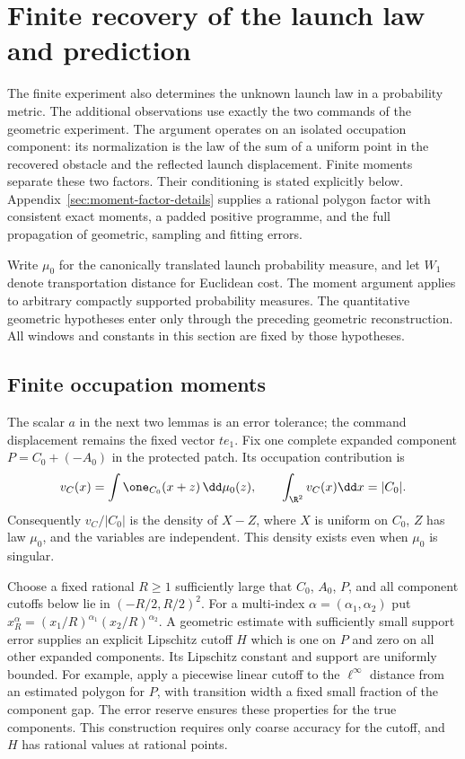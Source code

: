\section{Finite recovery of the launch law and prediction}
\label{sec:two-field-finite-law}
The finite experiment also determines the unknown launch law in a
probability metric.  The additional observations use exactly the two
commands of the geometric experiment.  The argument operates on an
isolated occupation component: its normalization is the law of the
sum of a uniform point in the recovered obstacle and the reflected
launch displacement.  Finite moments separate these two factors.
Their conditioning is stated explicitly below.
Appendix~\ref{sec:moment-factor-details} supplies a rational polygon
factor with consistent exact moments, a padded positive programme,
and the full propagation of geometric, sampling and fitting errors.

Write $\mu_0$ for the canonically translated launch probability
measure, and let $W_1$ denote transportation distance for Euclidean
cost.  The moment argument applies to arbitrary compactly supported
probability measures.  The quantitative geometric hypotheses enter
only through the preceding geometric reconstruction.  All windows
and constants in this section are fixed by those hypotheses.

\subsection{Finite occupation moments}
The scalar $a$ in the next two lemmas is an error tolerance; the
command displacement remains the fixed vector $te_1$.
Fix one complete expanded component $P=C_0+(-A_0)$ in the protected
patch.  Its occupation contribution is
\begin{equation}\label{eq:two-field-component-occupation}
 v_C(x)=\int\one_{C_0}(x+z)\,\dd\mu_0(z),\qquad
 \int_{\R^2}v_C(x)\dd x=|C_0|.
\end{equation}
Consequently $v_C/|C_0|$ is the density of $X-Z$, where $X$ is uniform
on $C_0$, $Z$ has law $\mu_0$, and the variables are independent.
This density exists even when $\mu_0$ is singular.

Choose a fixed rational $R\ge1$ sufficiently large that $C_0$, $A_0$,
$P$, and all component cutoffs below lie in $(-R/2,R/2)^2$.
For a multi-index $\alpha=(\alpha_1,\alpha_2)$ put
$x_R^\alpha=(x_1/R)^{\alpha_1}(x_2/R)^{\alpha_2}$.
A geometric estimate with sufficiently small support error supplies
an explicit Lipschitz cutoff $H$ which is one on $P$ and zero on
all other expanded components.  Its Lipschitz constant and support
are uniformly bounded.  For example, apply a piecewise linear
cutoff to the $\ell^\infty$ distance from an estimated polygon for
$P$, with transition width a fixed small fraction of the component
gap.  The error reserve ensures these properties for the true
components.  This construction requires only coarse accuracy for
the cutoff, and $H$ has rational values at rational points.

